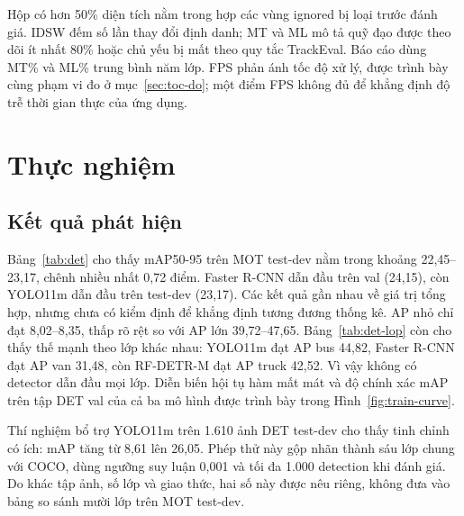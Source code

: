 \documentclass[fontsize=13pt,a4paper,oneside,parskip=false,numbers=noenddot,bibliography=totoc]{scrreprt}
\begin{document}
Hộp có hơn 50\% diện tích nằm trong hợp các vùng ignored bị loại trước đánh giá. IDSW đếm số lần thay đổi định danh; MT và ML mô tả quỹ đạo được theo dõi ít nhất 80\% hoặc chủ yếu bị mất theo quy tắc TrackEval. Báo cáo dùng MT\% và ML\% trung bình năm lớp. FPS phản ánh tốc độ xử lý, được trình bày cùng phạm vi đo ở mục~\ref{sec:toc-do}; một điểm FPS không đủ để khẳng định độ trễ thời gian thực của ứng dụng.

\section{Thực nghiệm}
\label{sec:thuc-nghiem}

\subsection{Kết quả phát hiện}
\label{sec:ket-qua-det}

Bảng~\ref{tab:det} cho thấy mAP50-95 trên MOT test-dev nằm trong khoảng 22,45--23,17, chênh nhiều nhất 0,72 điểm. Faster R-CNN dẫn đầu trên val (24,15), còn YOLO11m dẫn đầu trên test-dev (23,17). Các kết quả gần nhau về giá trị tổng hợp, nhưng chưa có kiểm định để khẳng định tương đương thống kê. AP nhỏ chỉ đạt 8,02--8,35, thấp rõ rệt so với AP lớn 39,72--47,65. Bảng~\ref{tab:det-lop} còn cho thấy thế mạnh theo lớp khác nhau: YOLO11m đạt AP bus 44,82, Faster R-CNN đạt AP van 31,48, còn RF-DETR-M đạt AP truck 42,52. Vì vậy không có detector dẫn đầu mọi lớp. Diễn biến hội tụ hàm mất mát và độ chính xác mAP trên tập DET val của cả ba mô hình được trình bày trong Hình~\ref{fig:train-curve}.

Thí nghiệm bổ trợ YOLO11m trên 1.610 ảnh DET test-dev cho thấy tinh chỉnh có ích: mAP tăng từ 8,61 lên 26,05. Phép thử này gộp nhãn thành sáu lớp chung với COCO, dùng ngưỡng suy luận 0,001 và tối đa 1.000 detection khi đánh giá. Do khác tập ảnh, số lớp và giao thức, hai số này được nêu riêng, không đưa vào bảng so sánh mười lớp trên MOT test-dev.
\end{document}
